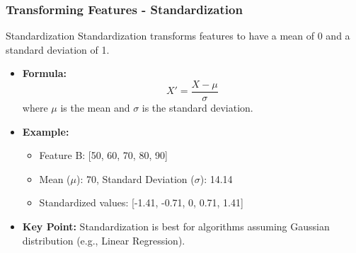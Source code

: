 \documentclass[aspectratio=169]{beamer}
\begin{document}
\begin{frame}[fragile]
    \frametitle{Transforming Features - Standardization}
    \begin{block}{Standardization}
        Standardization transforms features to have a mean of 0 and a standard deviation of 1.
        \begin{itemize}
            \item \textbf{Formula:} 
            \[
            X' = \frac{X - \mu}{\sigma}
            \]
            where $\mu$ is the mean and $\sigma$ is the standard deviation.
            \item \textbf{Example:} 
                \begin{itemize}
                    \item Feature B: [50, 60, 70, 80, 90]
                    \item Mean ($\mu$): 70, Standard Deviation ($\sigma$): 14.14 
                    \item Standardized values: [-1.41, -0.71, 0, 0.71, 1.41]
                \end{itemize}
            \item \textbf{Key Point:} 
                Standardization is best for algorithms assuming Gaussian distribution (e.g., Linear Regression).
        \end{itemize}
    \end{block}
\end{frame}
\end{document}
